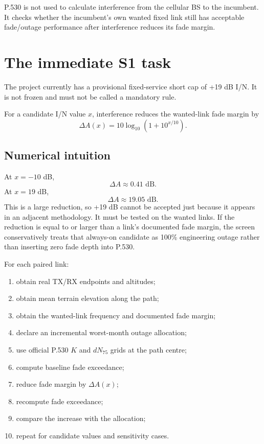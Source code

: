 \documentclass[11pt]{article}
\begin{document}
P.530 is not used to calculate interference from the cellular BS to the incumbent. It checks whether the incumbent's own wanted fixed link still has acceptable fade/outage performance after interference reduces its fade margin.

\section{The immediate S1 task}

The project currently has a provisional fixed-service short cap of +19 dB I/N. It is not frozen and must not be called a mandatory rule.

For a candidate I/N value $x$, interference reduces the wanted-link fade margin by
\begin{equation}
 \Delta A(x)=10\log_{10}(1+10^{x/10}).
\end{equation}

\subsection{Numerical intuition}

At $x=-10$ dB,
\begin{equation}
 \Delta A\approx0.41\text{ dB}.
\end{equation}
At $x=19$ dB,
\begin{equation}
 \Delta A\approx19.05\text{ dB}.
\end{equation}
This is a large reduction, so +19 dB cannot be accepted just because it appears in an adjacent methodology. It must be tested on the wanted links. If the reduction is equal to or larger than a link's documented fade margin, the screen conservatively treats that always-on candidate as 100\% engineering outage rather than inserting zero fade depth into P.530.

For each paired link:

\begin{enumerate}
\item obtain real TX/RX endpoints and altitudes;
\item obtain mean terrain elevation along the path;
\item obtain the wanted-link frequency and documented fade margin;
\item declare an incremental worst-month outage allocation;
\item use official P.530 $K$ and $dN_{75}$ grids at the path centre;
\item compute baseline fade exceedance;
\item reduce fade margin by $\Delta A(x)$;
\item recompute fade exceedance;
\item compare the increase with the allocation;
\item repeat for candidate values and sensitivity cases.
\end{enumerate}
\end{document}
